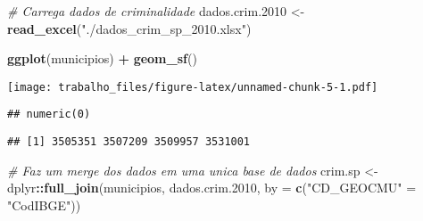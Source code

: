 \documentclass[]{article}
\newenvironment{Shaded}{\begin{snugshade}}{\end{snugshade}}
\newcommand{\KeywordTok}[1]{\textcolor[rgb]{0.13,0.29,0.53}{\textbf{#1}}}
\newcommand{\DataTypeTok}[1]{\textcolor[rgb]{0.13,0.29,0.53}{#1}}
\newcommand{\DecValTok}[1]{\textcolor[rgb]{0.00,0.00,0.81}{#1}}
\newcommand{\StringTok}[1]{\textcolor[rgb]{0.31,0.60,0.02}{#1}}
\newcommand{\CommentTok}[1]{\textcolor[rgb]{0.56,0.35,0.01}{\textit{#1}}}
\newcommand{\OperatorTok}[1]{\textcolor[rgb]{0.81,0.36,0.00}{\textbf{#1}}}
\newcommand{\NormalTok}[1]{#1}
\begin{document}
\begin{Shaded}
\begin{Highlighting}[]
\CommentTok{# Carrega dados de criminalidade}
\NormalTok{dados.crim.}\DecValTok{2010}\NormalTok{ <-}\StringTok{ }\KeywordTok{read_excel}\NormalTok{(}\StringTok{"./dados_crim_sp_2010.xlsx"}\NormalTok{)}
\end{Highlighting}
\end{Shaded}

\begin{Shaded}
\begin{Highlighting}[]
\KeywordTok{ggplot}\NormalTok{(municipios) }\OperatorTok{+}\StringTok{ }\KeywordTok{geom_sf}\NormalTok{()}
\end{Highlighting}
\end{Shaded}

\texttt{[image: trabalho\_files/figure-latex/unnamed-chunk-5-1.pdf]}

\begin{Shaded}
\end{Shaded}

\begin{verbatim}
## numeric(0)
\end{verbatim}

\begin{Shaded}
\end{Shaded}

\begin{verbatim}
## [1] 3505351 3507209 3509957 3531001
\end{verbatim}

\begin{Shaded}
\begin{Highlighting}[]
\CommentTok{# Faz um merge dos dados em uma unica base de dados}
\NormalTok{crim.sp <-}\StringTok{ }\NormalTok{dplyr}\OperatorTok{::}\KeywordTok{full_join}\NormalTok{(municipios, dados.crim.}\DecValTok{2010}\NormalTok{,  }\DataTypeTok{by =} \KeywordTok{c}\NormalTok{(}\StringTok{"CD_GEOCMU"}\NormalTok{ =}\StringTok{ "CodIBGE"}\NormalTok{))}
\end{Highlighting}
\end{Shaded}
\end{document}
